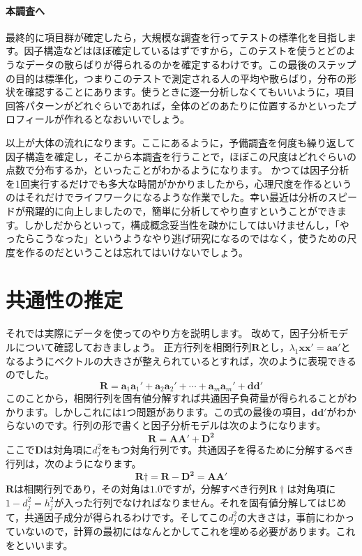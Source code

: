 \documentclass{ltjsbook}
\begin{document}
\paragraph{本調査へ}最終的に項目群が確定したら，大規模な調査を行ってテストの標準化を目指します。因子構造などはほぼ確定しているはずですから，このテストを使うとどのようなデータの散らばりが得られるのかを確定するわけです。この最後のステップの目的は標準化，つまりこのテストで測定される人の平均や散らばり，分布の形状を確認することにあります。使うときに逐一分析しなくてもいいように，項目回答パターンがどれぐらいであれば，全体のどのあたりに位置するかといったプロフィールが作れるとなおいいでしょう。

以上が大体の流れになります。ここにあるように，予備調査を何度も繰り返して因子構造を確定し，そこから本調査を行うことで，ほぼこの尺度はどれぐらいの点数で分布するか，といったことがわかるようになります。
かつては因子分析を1回実行するだけでも多大な時間がかかりましたから，心理尺度を作るというのはそれだけでライフワークになるような作業でした。幸い最近は分析のスピードが飛躍的に向上しましたので，簡単に分析してやり直すということができます。しかしだからといって，構成概念妥当性を疎かにしてはいけませんし，「やったらこうなった」というようなやり逃げ研究になるのではなく，使うための尺度を作るのだということは忘れてはいけないでしょう。

\section{共通性の推定}

それでは実際にデータを使ってのやり方を説明します。
改めて，因子分析モデルについて確認しておきましょう。
正方行列を相関行列$\bm{R}$とし，$\lambda_1 \bm{xx'} = \bm{aa'}$となるようにベクトルの大きさが整えられているとすれば，次のように表現できるのでした。
\begin{equation}
	\bm{R}=\bm{a}_1\bm{a}_1'+\bm{a}_2\bm{a}_2'+\cdots +\bm{a}_m\bm{a}_m'+\bm{d} \bm{d}'
\end{equation}
このことから，相関行列を固有値分解すれば共通因子負荷量が得られることがわかります。しかしこれには1つ問題があります。この式の最後の項目，$\bm{d} \bm{d}'$がわからないのです。行列の形で書くと因子分析モデルは次のようになります。
\[
	\bm{R} = \bm{AA'}+\bm{D^2}
\]
ここで$\bm{D}$は対角項に$d_j^2$をもつ対角行列です。共通因子を得るために分解するべき行列は，次のようになります。
\[
	\bm{R}\dagger = \bm{R}-\bm{D^2} = \bm{AA'}
\]
$\bm{R}$は相関行列であり，その対角は$1.0$ですが，分解すべき行列$\bm{R}\dagger$は対角項に$1-d_j^2=h_j^2$が入った行列でなければなりません。それを固有値分解してはじめて，共通因子成分が得られるわけです。そしてこの$d_j^2$の大きさは，事前にわかっていないので，計算の最初にはなんとかしてこれを埋める必要があります。これをといいます。
\end{document}
